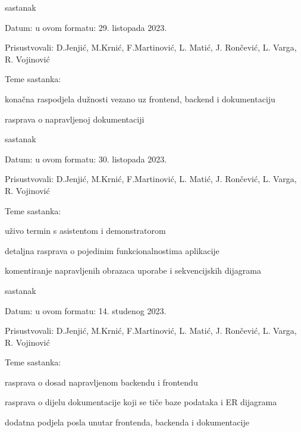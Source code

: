 \begin{packed_enum}
			\item  sastanak
			\item[] \begin{packed_item}
				\item Datum: u ovom formatu: 29. listopada 2023.
				\item Prisustvovali: D.Jenjić, M.Krnić, F.Martinović, L. Matić, J. Rončević, L. Varga, R. Vojinović
				\item Teme sastanka:
				\begin{packed_item}
					\item  konačna raspodjela dužnosti vezano uz frontend, backend i dokumentaciju
					\item  rasprava o napravljenoj dokumentaciji
				\end{packed_item}
			\end{packed_item}
			
			\vspace{1cm}
			
			\item  sastanak
			\item[] \begin{packed_item}
				\item Datum: u ovom formatu: 30. listopada 2023.
				\item Prisustvovali: D.Jenjić, M.Krnić, F.Martinović, L. Matić, J. Rončević, L. Varga, R. Vojinović
				\item Teme sastanka:
				\begin{packed_item}
					\item  uživo termin s asistentom i demonstratorom
					\item  detaljna rasprava o pojedinim funkcionalnostima aplikacije
					\item  komentiranje napravljenih obrazaca uporabe i sekvencijskih dijagrama
				\end{packed_item}
			\end{packed_item}
			
			\item  sastanak
			\item[] \begin{packed_item}
				\item Datum: u ovom formatu: 14. studenog 2023.
				\item Prisustvovali: D.Jenjić, M.Krnić, F.Martinović, L. Matić, J. Rončević, L. Varga, R. Vojinović
				\item Teme sastanka:
				\begin{packed_item}
					\item  rasprava o dosad napravljenom backendu i frontendu
					\item  rasprava o dijelu dokumentacije koji se tiče baze podataka i ER dijagrama
					\item  dodatna podjela posla unutar frontenda, backenda i dokumentacije
				\end{packed_item}
			\end{packed_item}
			

\end{packed_enum}
